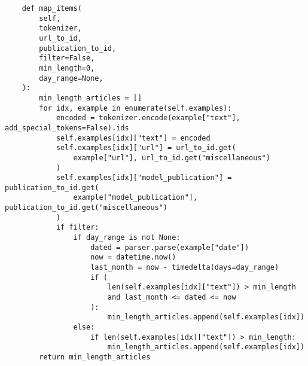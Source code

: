 \begin{verbatim}
    def map_items(
        self,
        tokenizer,
        url_to_id,
        publication_to_id,
        filter=False,
        min_length=0,
        day_range=None,
    ):
        min_length_articles = []
        for idx, example in enumerate(self.examples):
            encoded = tokenizer.encode(example["text"], add_special_tokens=False).ids
            self.examples[idx]["text"] = encoded
            self.examples[idx]["url"] = url_to_id.get(
                example["url"], url_to_id.get("miscellaneous")
            )
            self.examples[idx]["model_publication"] = publication_to_id.get(
                example["model_publication"], publication_to_id.get("miscellaneous")
            )
            if filter:
                if day_range is not None:
                    dated = parser.parse(example["date"])
                    now = datetime.now()
                    last_month = now - timedelta(days=day_range)
                    if (
                        len(self.examples[idx]["text"]) > min_length
                        and last_month <= dated <= now
                    ):
                        min_length_articles.append(self.examples[idx])
                else:
                    if len(self.examples[idx]["text"]) > min_length:
                        min_length_articles.append(self.examples[idx])
        return min_length_articles

\end{verbatim}